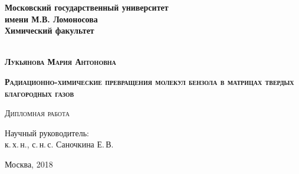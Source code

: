 \begin{titlepage}
\newpage

\begin{center}

\textbf{Московский государственный университет\\ имени М.В. Ломоносова}\\
\textbf{Химический факультет}\\
\\
\end{center}
\vspace{1cm}


\vspace{8em}
\begin{center}
\textsc{\textbf{Лукьянова Мария Антоновна}}
\vspace{1cm}


\textsc{\textbf{\large Радиационно-химические превращения молекул бензола в матрицах твердых благородных газов}}


\vspace{1em}

\textsc{Дипломная работа}
\end{center}
\vspace{7em}
\begin{flushright}
Научный руководитель:\\
к.\,х.\,н., с.\,н.\,с. Саночкина Е.\,В.

\end{flushright}

\vspace{\fill}

\begin{center}
Москва, 2018
\end{center}

\end{titlepage}
